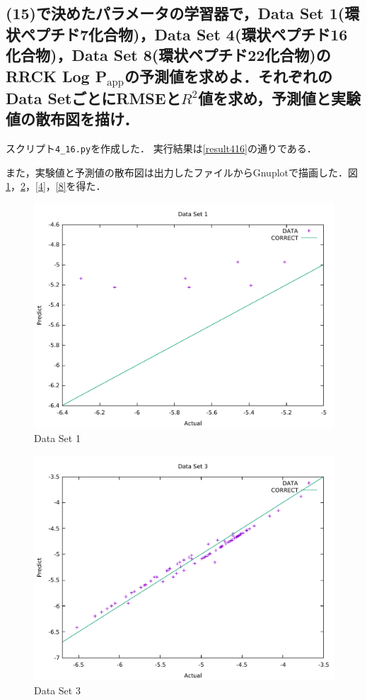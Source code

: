 \documentclass[uplatex,a4j]{jsarticle}
\begin{document}
  \subsection{(15)で決めたパラメータの学習器で，Data Set 1(環状ペプチド7化合物)，Data Set 4(環状ペプチド16化合物)，Data Set 8(環状ペプチド22化合物)のRRCK Log P$_\text{app}$の予測値を求めよ．それぞれのData SetごとにRMSEと$R^2$値を求め，予測値と実験値の散布図を描け．}
  スクリプト{\tt 4\_16.py}を作成した．
  実行結果は\ref{result416}の通りである．
  
  また，実験値と予測値の散布図は出力したファイルからGnuplotで描画した．図\ref{1}，\ref{3}，\ref{4}，\ref{8}を得た．
  \begin{figure}[H]
    \begin{center}
      \includegraphics[width=13cm]{pre1.pdf}
      \caption{Data Set 1}
      \label{1}
    \end{center}
  \end{figure}
  \begin{figure}[H]
    \begin{center}
      \includegraphics[width=13cm]{pre3.pdf}
      \caption{Data Set 3}
      \label{3}
    \end{center}
  \end{figure}
\end{document}
